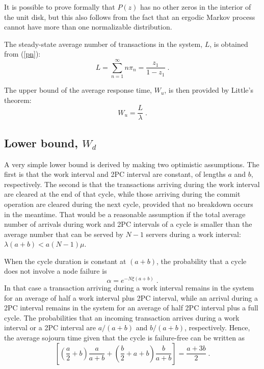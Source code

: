 It is possible to prove formally that $P(z)$ has no other zeros in the interior of
the unit disk, but this also follows from the fact that an ergodic Markov process
cannot have more than one normalizable distribution.

The steady-state average number of transactions in the system, $L$, is obtained from
(\ref{pn}):
\begin{equation} \label{L}
L =  \sum_{n=1}^\infty n\pi_n = \frac{z_1}{1-z_1}\;.
\end{equation}

The upper bound of the average response time, $W_u$, is then provided by Little's
theorem:
\begin{equation} \label{Wu}
W_u = \frac{L}{\lambda}\;.
\end{equation}



\subsection{Lower bound, $W_d$}
\label{subsec:lowerbound}

A very simple lower bound is derived by making two optimistic assumptions.
The first is that the work interval and 2PC interval are constant, of lengths
$a$ and $b$, respectively. The second is that the transactions arriving during the work
interval are cleared at the end of that cycle, while those arriving during the
commit operation are cleared during the next cycle, provided that no breakdown
occurs in the meantime. That would be a reasonable assumption if the total
average number of arrivals during work and 2PC intervals of a cycle is smaller than the average
number that can be served by $N-1$ servers during a work interval:
$\lambda (a+b)< a (N-1)\mu$.

When the cycle duration is constant at $(a+b)$, the probability that a cycle does not
involve a node failure is
\begin{equation} \label{a2}
\alpha = e^{-N\xi(a+b)}\;.
\end{equation}
In that case a transaction arriving during a work interval remains in the system for an
average of half a work interval plus 2PC interval, while an arrival during a
2PC interval remains in the system for an average of half 2PC interval
plus a full cycle. The probabilities that an incoming transaction arrives during a work
interval or a 2PC interval are $a/(a+b)$ and $b/(a+b)$, respectively. Hence,
the average sojourn time given that the cycle is failure-free  can be written as
\[
\left [ (\frac{a}{2}+b)\frac{a}{a+b} + (\frac{b}{2}+a+b)\frac{b}{a+b} \right ]
= \frac{a+3b}{2}\;.
\]


